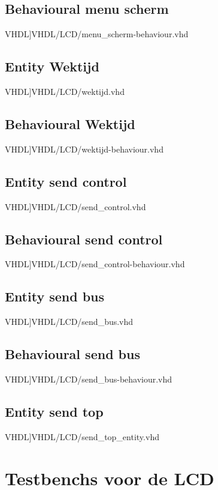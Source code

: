 \subsection{Behavioural menu scherm}
\scriptsize 
 VHDL]{VHDL/LCD/menu_scherm-behaviour.vhd}
\normalsize
\label{code:ent_wektijd}
\subsection{Entity Wektijd}
\scriptsize 
 VHDL]{VHDL/LCD/wektijd.vhd}
\normalsize
\label{code:beh_wektijd}
\subsection{Behavioural Wektijd}
\scriptsize 
 VHDL]{VHDL/LCD/wektijd-behaviour.vhd}
\normalsize
\label{code:ent_send_control}
\subsection{Entity send control}
\scriptsize 
 VHDL]{VHDL/LCD/send_control.vhd}
\normalsize
\label{code:beh_send_control}
\subsection{Behavioural send control}
\scriptsize 
 VHDL]{VHDL/LCD/send_control-behaviour.vhd}
\normalsize
\label{code:ent_send_bus}
\subsection{Entity send bus}
\scriptsize 
 VHDL]{VHDL/LCD/send_bus.vhd}
\normalsize
\label{code:beh_send_bus}
\subsection{Behavioural send bus}
\scriptsize 
 VHDL]{VHDL/LCD/send_bus-behaviour.vhd}
\normalsize
\label{code:ent_send_top}
\subsection{Entity send top}
\scriptsize 
 VHDL]{VHDL/LCD/send_top_entity.vhd}
\normalsize
\label{code:struc_send_top}

\section{Testbenchs voor de LCD}
